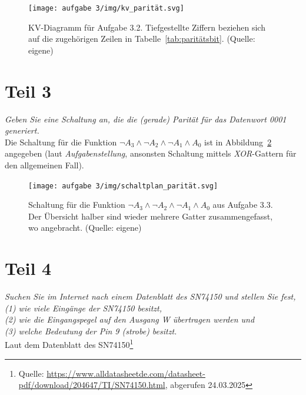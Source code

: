 \begin{figure}
    \centering
    \texttt{[image: aufgabe 3/img/kv\_parität.svg]}
    \caption{KV-Diagramm für Aufgabe 3.2. Tiefgestellte Ziffern beziehen sich auf die zugehörigen Zeilen in Tabelle~\ref{tab:paritätsbit}.  (Quelle: eigene)}
    \label{fig:kv_parität}
\end{figure}

\section{Teil 3}

\textit{Geben Sie eine Schaltung an, die die (gerade) Parität für das Datenwort  0001 generiert.}\\

\noindent
Die Schaltung für die Funktion $\neg A_3 \land \neg A_2 \land \neg A_1 \land A_0$ ist in Abbildung~\ref{fig:schaltplan_parität} angegeben (laut \textit{Aufgabenstellung}, ansonsten Schaltung mittels \textit{XOR}-Gattern für den allgemeinen Fall).

\begin{figure}
    \centering
    \texttt{[image: aufgabe 3/img/schaltplan\_parität.svg]}
    \caption{Schaltung für die Funktion $\neg A_3 \land \neg A_2 \land \neg A_1 \land A_0$ aus Aufgabe 3.3. Der Übersicht halber sind wieder mehrere Gatter zusammengefasst, wo angebracht. (Quelle: eigene)}
    \label{fig:schaltplan_parität}
\end{figure}

\section{Teil 4}

\textit{Suchen Sie im Internet nach einem Datenblatt des SN74150 und stellen
Sie fest,\\
    (1) wie viele Eingänge der SN74150 besitzt,\\
    (2) wie die Eingangspegel auf den Ausgang W übertragen werden und\\
    (3) welche Bedeutung der Pin 9 (strobe) besitzt.
}\\

\noindent
Laut dem Datenblatt des SN74150\footnote{
Quelle: \url{https://www.alldatasheetde.com/datasheet-pdf/download/204647/TI/SN74150.html}, abgerufen 24.03.2025
}


